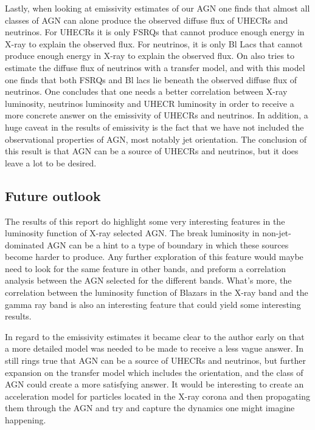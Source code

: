 Lastly, when looking at emissivity estimates of our AGN one finds that almost all classes of AGN can alone produce the observed diffuse flux of UHECRs and neutrinos. For UHECRs it is only FSRQs that cannot produce enough energy in X-ray to explain the observed flux. For neutrinos, it is only Bl Lacs that cannot produce enough energy in X-ray to explain the observed flux. On also tries to estimate the diffuse flux of neutrinos with a transfer model, and with this model one finds that both FSRQs and Bl lacs lie beneath the observed diffuse flux of neutrinos. One 
concludes that one needs a better correlation between X-ray luminosity, neutrinos luminosity and UHECR luminosity in order to receive a more concrete answer on the emissivity of UHECRs and neutrinos. In addition, a huge caveat in the results of emissivity is the fact that we have not included the observational properties of AGN, most notably jet orientation. The conclusion of this result is that AGN can be a source of UHECRs and neutrinos, but it does leave a lot to be desired. 



\subsection{Future outlook}
The results of this report do highlight some very interesting features in the luminosity function of X-ray selected AGN. The break luminosity in non-jet-dominated AGN can be a hint to a type of boundary in which these sources become harder to produce. 
Any further exploration of this feature would maybe need to look for the same feature in other bands, and preform a correlation analysis between the AGN selected for the different bands. What's more, the correlation between the luminosity function of Blazars in the X-ray band and the gamma ray band is also an interesting feature that could yield some interesting results. 

In regard to the emissivity estimates it became clear to the author early on that a more detailed model was needed to be made to receive a less vague answer. In still rings true that AGN can be a source of UHECRs and neutrinos, but further expansion on the transfer model which includes the orientation, and the class of AGN could create a more satisfying answer. 
It would be interesting to create an acceleration model for particles located in the X-ray corona and then propagating them through the AGN and try and capture the dynamics one might imagine happening. 